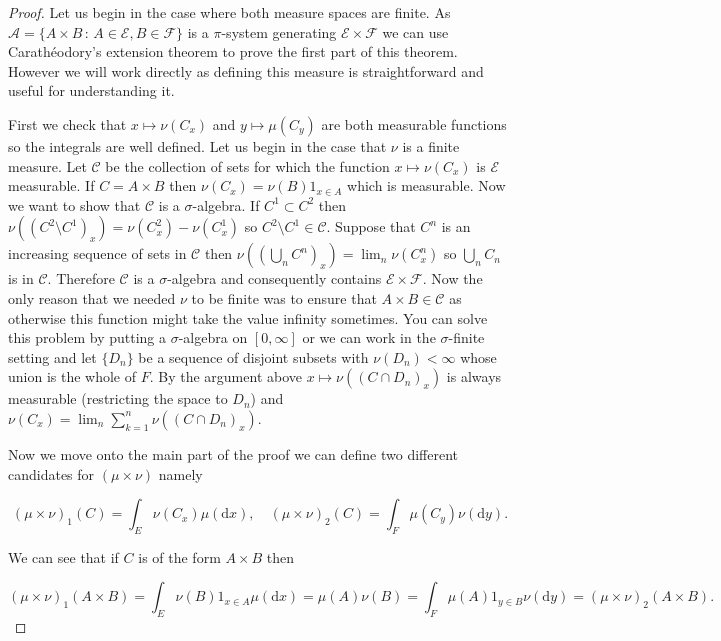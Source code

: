 \documentclass[
]{book}
\theoremstyle{definition}
\theoremstyle{definition}
\theoremstyle{definition}
\theoremstyle{definition}
\theoremstyle{remark}
\begin{document}
\begin{proof}
Let us begin in the case where both measure spaces are finite.
As \(\mathcal{A} = \{ A \times B \,:\, A \in \mathcal{E}, B \in \mathcal{F}\}\) is a \(\pi\)-system generating \(\mathcal{E} \times \mathcal{F}\) we can use Carathéodory's extension theorem to prove the first part of this theorem. However we will work directly as defining this measure is straightforward and useful for understanding it.

First we check that \(x \mapsto \nu(C_x)\) and \(y \mapsto \mu(C_y)\) are both measurable functions so the integrals are well defined. Let us begin in the case that \(\nu\) is a finite measure. Let \(\mathcal{C}\) be the collection of sets for which the function \(x \mapsto \nu(C_x)\) is \(\mathcal{E}\) measurable. If \(C = A \times B\) then \(\nu(C_x) = \nu(B)1_{x \in A}\) which is measurable. Now we want to show that \(\mathcal{C}\) is a \(\sigma\)-algebra. If \(C^1 \subset C^2\) then \(\nu((C^2 \setminus C^1)_x) = \nu(C^2_x) - \nu(C^1_x)\) so \(C^2 \setminus C^1 \in \mathcal{C}\). Suppose that \(C^n\) is an increasing sequence of sets in \(\mathcal{C}\) then \(\nu\left( \left(\bigcup_n C^n\right)_x\right) = \lim_n \nu \left( C^n_x\right)\) so \(\bigcup_n C_n\) is in \(\mathcal{C}\). Therefore \(\mathcal{C}\) is a \(\sigma\)-algebra and consequently contains \(\mathcal{E} \times \mathcal{F}\). Now the only reason that we needed \(\nu\) to be finite was to ensure that \(A \times B \in \mathcal{C}\) as otherwise this function might take the value infinity sometimes. You can solve this problem by putting a \(\sigma\)-algebra on \([0,\infty]\) or we can work in the \(\sigma\)-finite setting and let \(\{D_n\}\) be a sequence of disjoint subsets with \(\nu(D_n)< \infty\) whose union is the whole of \(F\). By the argument above \(x \mapsto \nu((C\cap D_n)_x)\) is always measurable (restricting the space to \(D_n\)) and \(\nu(C_x) = \lim_n \sum_{k=1}^n \nu((C \cap D_n)_x)\).

Now we move onto the main part of the proof we can define two different candidates for \((\mu \times \nu)\) namely

\[ (\mu \times \nu)_1(C) = \int_E \nu(C_x) \mu(\mathrm{d}x), \quad (\mu \times \nu)_2(C) = \int_F \mu(C_y) \nu(\mathrm{d}y). \]

We can see that if \(C\) is of the form \(A \times B\) then

\[ (\mu \times \nu)_1(A \times B) = \int_E \nu(B)1_{x \in A} \mu(\mathrm{d}x) = \mu(A) \nu(B) = \int_F \mu(A)1_{y \in B} \nu(\mathrm{d}y) = (\mu \times \nu)_2 (A \times B). \]


\end{proof}
\end{document}
